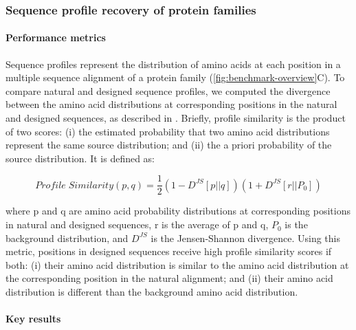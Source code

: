 \subsubsection{Sequence profile recovery of protein families}

\paragraph{Performance metrics}

Sequence profiles represent the distribution of amino acids at each position in a multiple sequence alignment of a protein family (\cref{fig:benchmark-overview}C). To compare natural and designed sequence profiles, we computed the divergence between the amino acid distributions at corresponding positions in the natural and designed sequences, as described in \cite{yona_within_2002}. Briefly, profile similarity is the product of two scores: (i) the estimated probability that two amino acid distributions represent the same source distribution; and (ii) the a priori probability of the source distribution. It is defined as:


\begin{equation}
  \label{eqn:prof-sim}
  Profile\;Similarity(p,q) = \frac{1}{2}(1 - {D^{JS}}[p||q])(1 + {D^{JS}}[r||{P_0}])
\end{equation}

where p and q are amino acid probability distributions at corresponding positions in natural and designed sequences, r is the average of p and q, $P_0$ is the background distribution, and $D^{JS}$ is the Jensen-Shannon divergence. Using this metric, positions in designed sequences receive high profile similarity scores if both: (i) their amino acid distribution is similar to the amino acid distribution at the corresponding position in the natural alignment; and (ii) their amino acid distribution is different than the background amino acid distribution.

\paragraph{Key results}

